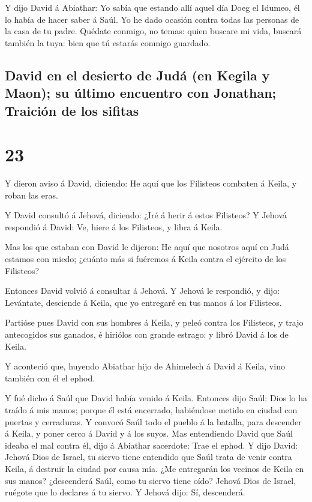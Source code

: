 Y dijo David á Abiathar: Yo sabía que estando allí aquel
día Doeg el Idumeo, él lo había de hacer saber á Saúl. Yo he dado
ocasión contra todas las personas de la casa de tu padre. 
Quédate conmigo, no temas: quien buscare mi vida, buscará también la
tuya: bien que tú estarás conmigo guardado.

\hypertarget{david-en-el-desierto-de-juduxe1-en-kegila-y-maon-su-uxfaltimo-encuentro-con-jonathan-traiciuxf3n-de-los-sifitas}{%
\subsection{David en el desierto de Judá (en Kegila y Maon); su último
encuentro con Jonathan; Traición de los
sifitas}\label{david-en-el-desierto-de-juduxe1-en-kegila-y-maon-su-uxfaltimo-encuentro-con-jonathan-traiciuxf3n-de-los-sifitas}}

\hypertarget{section-22}{%
\section{23}\label{section-22}}

 Y dieron aviso á David, diciendo: He aquí que los Filisteos
combaten á Keila, y roban las eras.

 Y David consultó á Jehová, diciendo: ¿Iré á herir á estos
Filisteos? Y Jehová respondió á David: Ve, hiere á los Filisteos, y
libra á Keila.

 Mas los que estaban con David le dijeron: He aquí que
nosotros aquí en Judá estamos con miedo; ¿cuánto más si fuéremos á Keila
contra el ejército de los Filisteos?

 Entonces David volvió á consultar á Jehová. Y Jehová le
respondió, y dijo: Levántate, desciende á Keila, que yo entregaré en tus
manos á los Filisteos.

 Partióse pues David con sus hombres á Keila, y peleó contra
los Filisteos, y trajo antecogidos sus ganados, é hiriólos con grande
estrago: y libró David á los de Keila.

 Y aconteció que, huyendo Abiathar hijo de Ahimelech á David
á Keila, vino también con él el ephod.

 Y fué dicho á Saúl que David había venido á Keila. Entonces
dijo Saúl: Dios lo ha traído á mis manos; porque él está encerrado,
habiéndose metido en ciudad con puertas y cerraduras.  Y
convocó Saúl todo el pueblo á la batalla, para descender á Keila, y
poner cerco á David y á los suyos.  Mas entendiendo David
que Saúl ideaba el mal contra él, dijo á Abiathar sacerdote: Trae el
ephod.  Y dijo David: Jehová Dios de Israel, tu siervo
tiene entendido que Saúl trata de venir contra Keila, á destruir la
ciudad por causa mía.  ¿Me entregarán los vecinos de Keila
en sus manos? ¿descenderá Saúl, como tu siervo tiene oído? Jehová Dios
de Israel, ruégote que lo declares á tu siervo. Y Jehová dijo: Sí,
descenderá.

